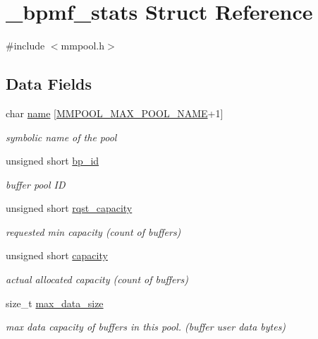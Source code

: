 \hypertarget{struct__bpmf__stats}{\section{\-\_\-bpmf\-\_\-stats Struct Reference}
\label{struct__bpmf__stats}
}


{\ttfamily \#include $<$mmpool.\-h$>$}

\subsection*{Data Fields}
\begin{DoxyCompactItemize}
\item 
char \hyperlink{struct__bpmf__stats_a56cac4709d8dcdd7d7d40d2261606d10}{name} \mbox{[}\hyperlink{mmpool_8h_ab1c7dc5e75ad9fc419f257e4cab04365}{M\-M\-P\-O\-O\-L\-\_\-\-M\-A\-X\-\_\-\-P\-O\-O\-L\-\_\-\-N\-A\-M\-E}+1\mbox{]}
\begin{DoxyCompactList}\small\item\em symbolic name of the pool \end{DoxyCompactList}\item 
unsigned short \hyperlink{struct__bpmf__stats_ae67b46be019334905e0dccdf8415174d}{bp\-\_\-id}
\begin{DoxyCompactList}\small\item\em buffer pool I\-D \end{DoxyCompactList}\item 
unsigned short \hyperlink{struct__bpmf__stats_ac445ecc06a5de1ce011330056aa9774b}{rqst\-\_\-capacity}
\begin{DoxyCompactList}\small\item\em requested min capacity (count of buffers) \end{DoxyCompactList}\item 
unsigned short \hyperlink{struct__bpmf__stats_a05ec8f5accddd579c000a50a6bfc80d2}{capacity}
\begin{DoxyCompactList}\small\item\em actual allocated capacity (count of buffers) \end{DoxyCompactList}\item 
size\-\_\-t \hyperlink{struct__bpmf__stats_a1fc8222b39b9e50ce780d8ec0205b972}{max\-\_\-data\-\_\-size}
\begin{DoxyCompactList}\small\item\em max data capacity of buffers in this pool. (buffer user data bytes) \end{DoxyCompactList}\item 

\end{DoxyCompactItemize}
